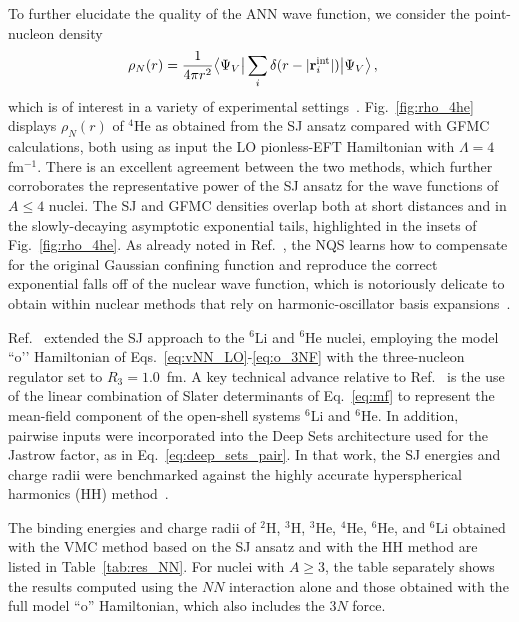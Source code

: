 To further elucidate the quality of the ANN wave function, we consider the point-nucleon density
\begin{align}
	\rho_{N}(r) &=\frac{1}{4\pi r^2}\big\langle\Psi_V \big|\sum_i \mathcal \delta(r-|\mathbf{r}_i^{\rm int}|)\big|\Psi_V \big\rangle\,, 
	\label{eq:rho_N}
\end{align}
which is of interest in a variety of experimental settings~\cite{de_vries_nuclear_1987,angeli_table_2013}. Fig.~\ref{fig:rho_4he} displays $\rho_{N}(r)$ of $^4$He as obtained from the SJ ansatz compared with GFMC calculations, both using as input the LO pionless-EFT Hamiltonian with $\Lambda =4$ fm$^{-1}$. There is an excellent agreement between the two methods, which further corroborates the representative power of the SJ ansatz for the wave functions of $A\leq 4$ nuclei. The SJ and GFMC densities overlap both at short distances and in the slowly-decaying asymptotic exponential tails, highlighted in the insets of Fig.~\ref{fig:rho_4he}. As already noted in Ref.~\cite{adams_variational_2021}, the NQS learns how to compensate for the original Gaussian confining function and reproduce the correct exponential falls off of the nuclear wave function, which is notoriously delicate to obtain within nuclear methods that rely on harmonic-oscillator basis expansions~\cite{caprio_robust_2022,sharaf_comparing_2019}.

Ref.~\cite{Gnech2021} extended the SJ approach to the $^6$Li and $^6$He nuclei, employing the model “o’’ Hamiltonian of Eqs.~\eqref{eq:vNN_LO}-\eqref{eq:o_3NF} with the three-nucleon regulator set to $R_3 = 1.0$~fm. A key technical advance relative to Ref.~\cite{adams_variational_2021} is the use of the linear combination of Slater determinants of Eq.~\eqref{eq:mf} to represent the mean-field component of the open-shell systems $^6$Li and $^6$He. In addition, pairwise inputs were incorporated into the Deep Sets architecture used for the Jastrow factor, as in Eq.~\eqref{eq:deep_sets_pair}. In that work, the SJ energies and charge radii were benchmarked against the highly accurate hyperspherical harmonics (HH) method~\cite{kievsky_high-precision_2008}.

The binding energies and charge radii of $^2$H, $^3$H, $^3$He, $^4$He, $^6$He, and $^6$Li obtained with the VMC method based on the SJ ansatz and with the HH method are listed in Table~\ref{tab:res_NN}. For nuclei with $A \geq 3$, the table separately shows the results computed using the $NN$ interaction alone and those obtained with the full model ``o'' Hamiltonian, which also includes the $3N$ force.

